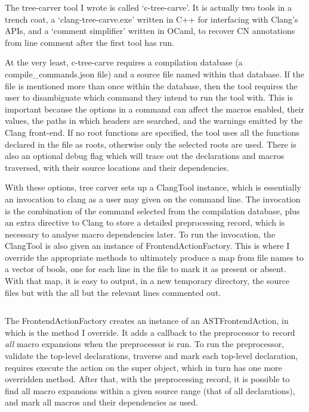 The tree-carver tool I wrote is called `c-tree-carve'. It is actually two tools
in a trench coat, a `clang-tree-carve.exe' written in C++ for interfacing with
Clang's APIs, and a `comment simplifier' written in OCaml, to recover CN
annotations from line comment after the first tool has run.

At the very least, c-tree-carve requires a compilation database (a
compile\_commands.json file) and a source file named within that database. If
the file is mentioned more than once within the database, then the tool
requires the user to disambiguate which command they intend to run the tool
with. This is important because the options in a command can affect the macros
enabled, their values, the paths in which headers are searched, and the
warnings emitted by the Clang front-end. If no root functions are specified,
the tool uses all the functions declared in the file as roots, otherwise only
the selected roots are used. There is also an optional debug flag which will
trace out the declarations and macros traversed, with their source locations
and their dependencies.

With these options, tree carver sets up a ClangTool instance, which is
essentially an invocation to clang as a user may given on the command line. The
invocation is the combination of the command selected from the compilation
database, plus an extra directive to Clang to store a detailed preprocessing
record, which is necessary to analyse macro dependencies later. To run the
invocation, the ClangTool is also given an instance of FrontendActionFactory.
This is where I override the appropriate methods to ultimately produce a map
from file names to a vector of bools, one for each line in the file to mark it
as present or absent. With that map, it is easy to output, in a new temporary
directory, the source files but with the all but the relevant lines commented
out.

\inputminted[breaklines,fontsize=\footnotesize]{cpp}{code/simplifier.cpp}

The FrontendActionFactory creates an instance of an ASTFrontendAction, in which
is the method I override. It adds a callback to the preprocessor to record
\emph{all} macro expansions when the preprocessor is run. To run the
preprocessor, validate the top-level declarations, traverse and mark each
top-level declaration, requires execute the action on the super object, which
in turn has one more overridden method. After that, with the preprocessing
record, it is possible to find all macro expansions within a given source range
(that of all declarations), and mark all macros and their dependencies as used.

